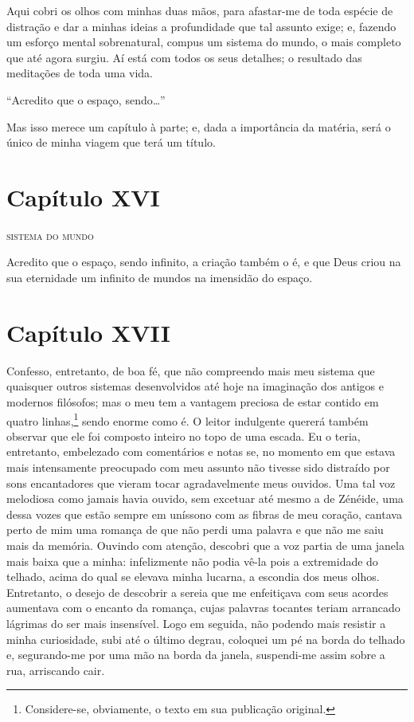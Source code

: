  Aqui cobri os olhos com minhas duas mãos, para afastar-me de toda
espécie de distração e dar a minhas ideias a profundidade que tal
assunto exige; e, fazendo um esforço mental sobrenatural, compus um
sistema do mundo, o mais completo que até agora surgiu. Aí está com
todos os seus detalhes; o resultado das meditações de toda uma vida.

``Acredito que o espaço, sendo\ldots''

 Mas isso merece um capítulo à parte; e, dada a importância da matéria,
será o único de minha viagem que terá um título.

\section{Capítulo XVI}

\textsc{sistema do mundo}

 Acredito que o espaço, sendo infinito, a criação também o é, e que Deus
criou na sua eternidade um infinito de mundos na imensidão do espaço.

\section{Capítulo XVII}

 Confesso, entretanto, de boa fé, que não compreendo mais meu sistema
que quaisquer outros sistemas desenvolvidos até hoje na imaginação dos
antigos e modernos filósofos; mas o meu tem a vantagem preciosa de
estar contido em quatro linhas,\footnote{ Considere-se, obviamente, o
texto em sua publicação original.} sendo enorme como é. O leitor
indulgente quererá também observar que ele foi composto inteiro no topo
de uma escada. Eu o teria, entretanto, embelezado com comentários e
notas se, no momento em que estava mais intensamente preocupado com meu
assunto não tivesse sido distraído por sons encantadores que vieram
tocar agradavelmente meus ouvidos. Uma tal voz melodiosa como jamais
havia ouvido, sem excetuar até mesmo a de Zénéide, uma dessa vozes que
estão sempre em uníssono com as fibras de meu coração, cantava perto de
mim uma romança de que não perdi uma palavra e que não me saiu mais da
memória. Ouvindo com atenção, descobri que a voz partia de uma janela
mais baixa que a minha: infelizmente não podia vê-la pois a extremidade
do telhado, acima do qual se elevava minha lucarna, a escondia dos meus
olhos. Entretanto, o desejo de descobrir a sereia que me enfeitiçava
com seus acordes aumentava com o encanto da romança, cujas
palavras tocantes teriam arrancado lágrimas do ser mais insensível.
Logo em seguida, não podendo mais resistir a minha curiosidade, subi
até o último degrau, coloquei um pé na borda do telhado e, segurando-me
por uma mão na borda da janela, suspendi-me assim sobre a rua,
arriscando cair. 

